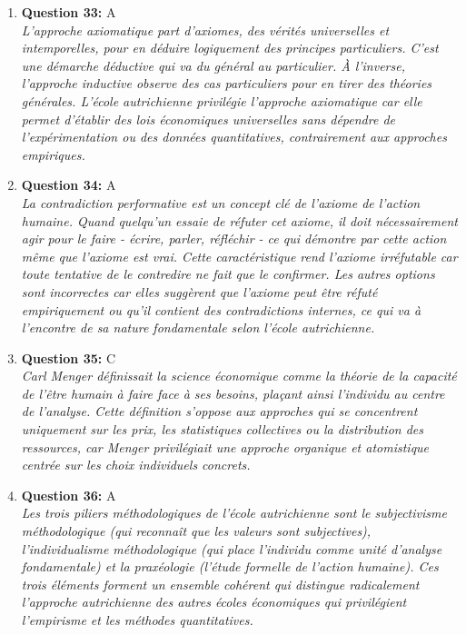 \documentclass[12pt,a4paper]{article}
\begin{document}
\begin{enumerate}
\item \textbf{Question 33:} A
\\ \textit{L'approche axiomatique part d'axiomes, des vérités universelles et intemporelles, pour en déduire logiquement des principes particuliers. C'est une démarche déductive qui va du général au particulier. À l'inverse, l'approche inductive observe des cas particuliers pour en tirer des théories générales. L'école autrichienne privilégie l'approche axiomatique car elle permet d'établir des lois économiques universelles sans dépendre de l'expérimentation ou des données quantitatives, contrairement aux approches empiriques.}

\item \textbf{Question 34:} A
\\ \textit{La contradiction performative est un concept clé de l'axiome de l'action humaine. Quand quelqu'un essaie de réfuter cet axiome, il doit nécessairement agir pour le faire - écrire, parler, réfléchir - ce qui démontre par cette action même que l'axiome est vrai. Cette caractéristique rend l'axiome irréfutable car toute tentative de le contredire ne fait que le confirmer. Les autres options sont incorrectes car elles suggèrent que l'axiome peut être réfuté empiriquement ou qu'il contient des contradictions internes, ce qui va à l'encontre de sa nature fondamentale selon l'école autrichienne.}

\item \textbf{Question 35:} C
\\ \textit{Carl Menger définissait la science économique comme la théorie de la capacité de l'être humain à faire face à ses besoins, plaçant ainsi l'individu au centre de l'analyse. Cette définition s'oppose aux approches qui se concentrent uniquement sur les prix, les statistiques collectives ou la distribution des ressources, car Menger privilégiait une approche organique et atomistique centrée sur les choix individuels concrets.}

\item \textbf{Question 36:} A
\\ \textit{Les trois piliers méthodologiques de l'école autrichienne sont le subjectivisme méthodologique (qui reconnaît que les valeurs sont subjectives), l'individualisme méthodologique (qui place l'individu comme unité d'analyse fondamentale) et la praxéologie (l'étude formelle de l'action humaine). Ces trois éléments forment un ensemble cohérent qui distingue radicalement l'approche autrichienne des autres écoles économiques qui privilégient l'empirisme et les méthodes quantitatives.}


\end{enumerate}
\end{document}
